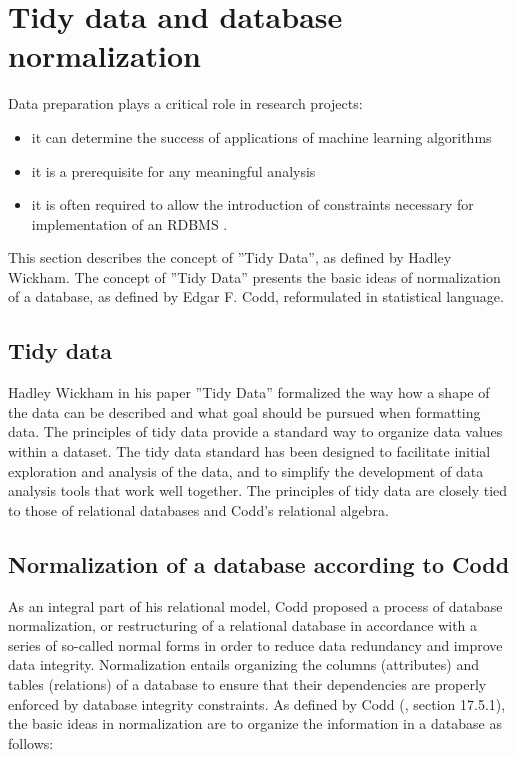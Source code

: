 \section{Tidy data and database normalization} \label{sec:db_norm_tidy_data}

Data preparation plays a critical role in research projects:

\begin{itemize}
    \item it can determine the success of applications of machine learning algorithms
    \item it is a prerequisite for any meaningful analysis
    \item it is often required to allow the introduction of constraints necessary for implementation of an RDBMS .
\end{itemize}

This section describes the concept of ''Tidy Data'', as defined by Hadley Wickham.
The concept of ''Tidy Data'' presents the basic ideas of normalization of a database, as defined by Edgar F. Codd, reformulated in statistical language.

\subsection{Tidy data} \label{subsec:tidy_data}

Hadley Wickham in his paper ''Tidy Data''\cite{Wickham2014} formalized the way how a shape of the data can be described and what goal should be pursued when formatting data.
The principles of tidy data provide a standard way to organize data values within a dataset.
The tidy data standard has been designed to facilitate initial exploration and analysis of the data, and to simplify the development of data analysis tools that work well together.
The principles of tidy data are closely tied to those of relational databases and Codd's relational algebra\cite{Codd1990}.

\subsection{Normalization of a database according to Codd} \label{subsec:db_norm}

As an integral part of his relational model, Codd proposed a process of database normalization, or restructuring of a relational database in accordance with a series of so-called normal forms in order to reduce data redundancy and improve data integrity.
Normalization entails organizing the columns (attributes) and tables (relations) of a database to ensure that their dependencies are properly enforced by database integrity constraints.
As defined by Codd (\cite{Codd1990}, section 17.5.1), the basic ideas in normalization are to organize the information in a database as follows:

